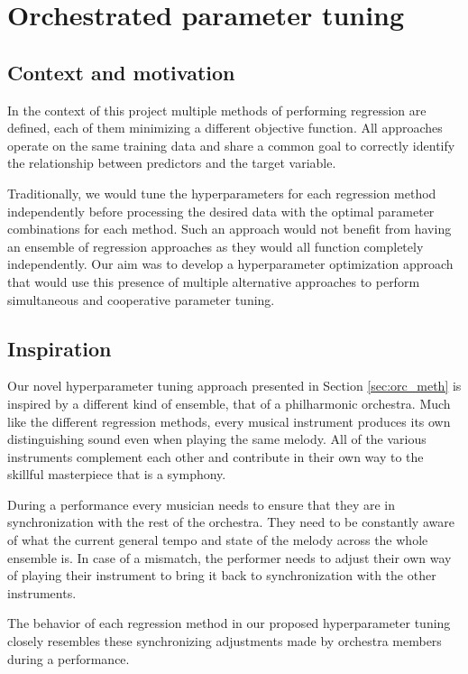 \section{Orchestrated parameter tuning} \label{sec:orc_par_tun}

\subsection{Context and motivation}
In the context of this project multiple methods of performing regression are defined, each of them minimizing a different objective function. All approaches operate on the same training data and share a common goal to correctly identify the relationship between predictors and the target variable. 

Traditionally, we would tune the hyperparameters for each regression method independently before processing the desired data with the optimal parameter combinations for each method. Such an approach would not benefit from having an ensemble of regression approaches as they would all function completely independently. Our aim was to develop a hyperparameter optimization approach that would use this presence of multiple alternative approaches to perform simultaneous and cooperative parameter tuning.

\subsection{Inspiration}
Our novel hyperparameter tuning approach presented in Section \ref{sec:orc_meth} is inspired by a different kind of ensemble, that of a philharmonic orchestra. Much like the different regression methods, every musical instrument produces its own distinguishing sound even when playing the same melody. All of the various instruments complement each other and contribute in their own way to the skillful masterpiece that is a symphony. 

During a performance every musician needs to ensure that they are in synchronization with the rest of the orchestra. They need to be constantly aware of what the current general tempo and state of the melody across the whole ensemble is. In case of a mismatch, the performer needs to adjust their own way of playing their instrument to bring it back to synchronization with the other instruments.

The behavior of each regression method in our proposed hyperparameter tuning closely resembles these synchronizing adjustments made by orchestra members during a performance.

